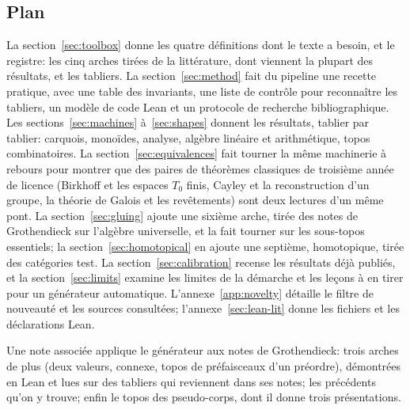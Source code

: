 \subsection{Plan}

La section~\ref{sec:toolbox} donne les quatre définitions dont le texte a besoin, et le registre: les cinq arches tirées de la littérature, dont viennent la plupart des résultats, et les tabliers. La section~\ref{sec:method} fait du pipeline une recette pratique, avec une table des invariants, une liste de contrôle pour reconnaître les tabliers, un modèle de code Lean et un protocole de recherche bibliographique. Les sections~\ref{sec:machines} à~\ref{sec:shapes} donnent les résultats, tablier par tablier: carquois, monoïdes, analyse, algèbre linéaire et arithmétique, topos combinatoires. La section~\ref{sec:equivalences} fait tourner la même machinerie à rebours pour montrer que des paires de théorèmes classiques de troisième année de licence (Birkhoff et les espaces $T_0$ finis, Cayley et la reconstruction d'un groupe, la théorie de Galois et les revêtements) sont deux lectures d'un même pont. La section~\ref{sec:gluing} ajoute une sixième arche, tirée des notes de Grothendieck sur l'algèbre universelle, et la fait tourner sur les sous-topos essentiels; la section~\ref{sec:homotopical} en ajoute une septième, homotopique, tirée des catégories test. La section~\ref{sec:calibration} recense les résultats déjà publiés, et la section~\ref{sec:limits} examine les limites de la démarche et les leçons à en tirer pour un générateur automatique. L'annexe~\ref{app:novelty} détaille le filtre de nouveauté et les sources consultées; l'annexe~\ref{sec:lean-lit} donne les fichiers et les déclarations Lean.

Une note associée \cite{bridges-notes} applique le générateur aux notes de Grothendieck: trois arches de plus (deux valeurs, connexe, topos de préfaisceaux d'un préordre), démontrées en Lean et lues sur des tabliers qui reviennent dans ses notes; les précédents qu'on y trouve; enfin le topos des pseudo-corps, dont il donne trois présentations.
